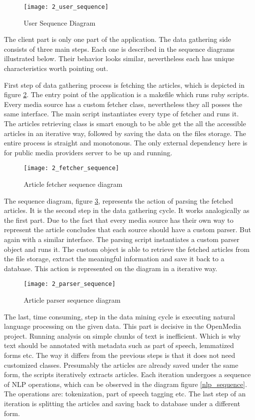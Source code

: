 \begin{figure}[!ht]
\centering
\texttt{[image: 2\_user\_sequence]}
\caption{User Sequence Diagram}\label{user_sequence}
\end{figure}

The client part is only one part of the application. The data gathering side consists of three main steps. Each one is described in the sequence diagrams illustrated below. Their behavior looks similar, nevertheless each has unique characteristics worth pointing out.

First step of data gathering process is fetching the articles, which is depicted in figure \ref{fetcher_sequence}. The entry point of the application is a makefile which runs ruby scripts. Every media source has a custom fetcher class, nevertheless they all posses the same interface. The main script instantiates every type of fetcher and runs it. The articles retrieving class is smart enough to be able get the all the accessible articles in an iterative way, followed by saving the data on the files storage. The entire process is straight and monotonous. The only external dependency here is for public media providers server to be up and running.

\begin{figure}[!ht]
\centering
\texttt{[image: 2\_fetcher\_sequence]}
\caption{Article fetcher sequence diagram}\label{fetcher_sequence}
\end{figure}

The sequence diagram, figure \ref{parser_sequence}, represents the action of parsing the fetched articles. It is the second step in the data gathering cycle. It works analogically as the first part. Due to the fact that every media source has their own way to represent the article concludes that each source should have a custom parser. But again with a similar interface. The parsing script instantiates a custom parser object and runs it. The custom object is able to retrieve the fetched articles from the file storage, extract the meaningful information and save it back to a database. This action is represented on the diagram in a iterative way.

\begin{figure}[!ht]
\centering
\texttt{[image: 2\_parser\_sequence]}
\caption{Article parser sequence diagram}\label{parser_sequence}
\end{figure}

The last, time consuming, step in the data mining cycle is executing natural language processing on the given data. This part is decisive in the OpenMedia project. Running analysis on simple chunks of text is inefficient. Which is why text should be annotated with metadata such as part of speech, lemmatized forms etc. The way it differs from the previous steps is that it does not need customized classes. Presumably the articles are already saved under the same form, the scripts iteratively extracts articles. Each iteration undergoes a sequence of NLP operations, which can be observed in the diagram figure \ref{nlp_sequence}. The operations are: tokenization, part of speech tagging etc. The last step of an iteration is splitting the articles and saving back to database under a different form.

